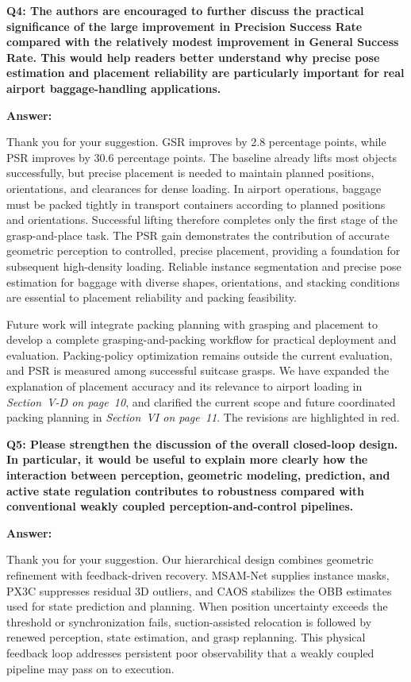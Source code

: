 \documentclass[journal,10pt]{IEEEtran}
\newcommand{\question}[2]{%
  \par\smallskip\noindent
  {\color{responseblue}\bfseries\clubpenalty=10000\widowpenalty=10000 Q#1: #2\par}%
  \par\nobreak\noindent
}
\newcommand{\answer}{%
  \par\smallskip\noindent
  \textbf{Answer: }\ignorespaces
}
\begin{document}
\question{4}{The authors are encouraged to further discuss the practical significance of the large improvement in Precision Success Rate compared with the relatively modest improvement in General Success Rate. This would help readers better understand why precise pose estimation and placement reliability are particularly important for real airport baggage-handling applications.}

\answer
Thank you for your suggestion. GSR improves by 2.8 percentage points, while PSR improves by 30.6 percentage points. The baseline already lifts most objects successfully, but precise placement is needed to maintain planned positions, orientations, and clearances for dense loading. In airport operations, baggage must be packed tightly in transport containers according to planned positions and orientations. Successful lifting therefore completes only the first stage of the grasp-and-place task. The PSR gain demonstrates the contribution of accurate geometric perception to controlled, precise placement, providing a foundation for subsequent high-density loading. Reliable instance segmentation and precise pose estimation for baggage with diverse shapes, orientations, and stacking conditions are essential to placement reliability and packing feasibility.

Future work will integrate packing planning with grasping and placement to develop a complete grasping-and-packing workflow for practical deployment and evaluation. Packing-policy optimization remains outside the current evaluation, and PSR is measured among successful suitcase grasps. We have expanded the explanation of placement accuracy and its relevance to airport loading in \textit{Section~V-D on page~10}, and clarified the current scope and future coordinated packing planning in \textit{Section~VI on page~11}. The revisions are highlighted in red.

\question{5}{Please strengthen the discussion of the overall closed-loop design. In particular, it would be useful to explain more clearly how the interaction between perception, geometric modeling, prediction, and active state regulation contributes to robustness compared with conventional weakly coupled perception-and-control pipelines.}

\answer
Thank you for your suggestion. Our hierarchical design combines geometric refinement with feedback-driven recovery. MSAM-Net supplies instance masks, PX3C suppresses residual 3D outliers, and CAOS stabilizes the OBB estimates used for state prediction and planning. When position uncertainty exceeds the threshold or synchronization fails, suction-assisted relocation is followed by renewed perception, state estimation, and grasp replanning. This physical feedback loop addresses persistent poor observability that a weakly coupled pipeline may pass on to execution.
\end{document}
